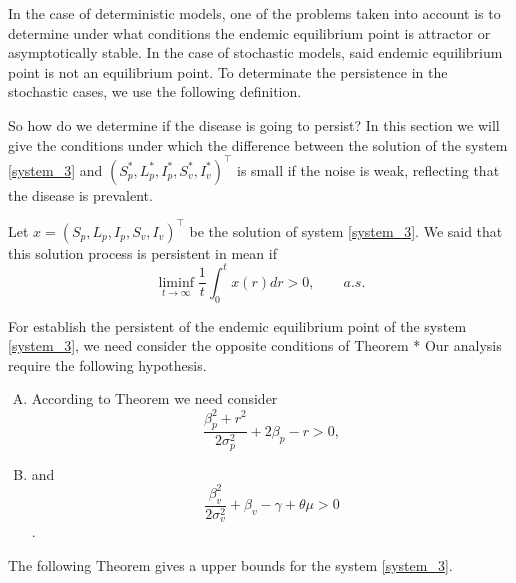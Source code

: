 
	In the case of deterministic models, one of the problems taken into
account is to determine under what conditions the endemic equilibrium point is 
attractor or asymptotically stable. In the case of stochastic models, said 
endemic equilibrium point is not an equilibrium point. To determinate the 
persistence in the stochastic cases, we use the following definition.

	So how do we determine if the disease is going to persist? In this section 
we will give the conditions under which the difference between the solution of 
the system \eqref{system_3} and $ (S_p^*, L_p^*, I_p^*, S_v^*, I_v^*)^\top$ is 
small if the noise is weak, reflecting that the disease is prevalent.
\begin{definition}\label{def_per}
	Let $x = (S_p,L_p,I_p,S_v,I_v)^{\top}$ be the solution of 
	system \eqref{system_3}. We said that this solution process is persistent in mean if	
	\begin{equation}
	    \liminf_{
	    	t \to
	    	\infty
	    }
	    \frac{1}{t}
	    \int_0^t x(r) dr >0,
	    \qquad a.s.
    \end{equation}
\end{definition}
For establish the persistent of the endemic equilibrium point of the system 
\eqref{system_3}, we need consider the opposite conditions of 
Theorem *%
Our analysis require the following hypothesis.
\begin{enumerate}[(A)]
	\item
	According to Theorem %
	we need consider  
	$$
		\frac{\beta_p^2+r^2}{2 \sigma_p^2} + 
		2\beta_p - r>0,
	$$ 
	\item
	and
	$$
		\frac{\beta_v^2}{2 \sigma_v^2}+\beta_v-\gamma +\theta\mu>0
	$$.
\end{enumerate}
The following Theorem gives a upper bounds for the system \eqref{system_3}.
%

